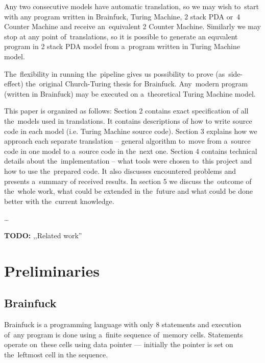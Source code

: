 \documentclass[english,shortabstract,mgr]{iithesis}
\newcommand{\todo}[1]{\textbf{TODO:} #1}
\begin{document}
Any two consecutive models have automatic translation, so we may wish to~start with any program written
in Brainfuck, Turing Machine, 2 stack PDA or~4 Counter Machine and receive an~equivalent 2 Counter Machine.
Similarly we may stop at any point of~translations, so it is possible to generate an equvalent program
in 2 stack PDA model from a~program written in Turing Machine model.

The~flexibility in running the~pipeline gives us possibility to prove (as~side-effect)
the~original Church-Turing thesis for Brainfuck. Any~modern program (written in Brainfuck) may be executed
on a~theoretical Turing Machine model.

This paper is organized as follows: Section 2 contains exact specification of all the~models used in translations.
It contains descriptions of how to write source code in each model (i.e. Turing Machine source code). Section 3
explains how we approach each separate translation -- general algorithm to~move from a~source code in one model
to a~source code in the~next one. Section 4 contains technical details about the~implementation -- what tools
were chosen to~this project and how to use the~prepared code. It also discusses encountered problems and presents
a~summary of received results. In section 5 we discuss the~outcome of the~whole work, what could be extended in the~future
and what could be done better with the~current knowledge.

\ldots

\todo{,,Related work''}

\chapter {Preliminaries}

\section {Brainfuck}

Brainfuck is a programming language with only $8$ statements and execution
of~any program is done using a~finite sequence of~memory cells. Statements
operate on~these cells using data pointer --- initially the pointer is set
on the~leftmost cell in the sequence.
\end{document}

